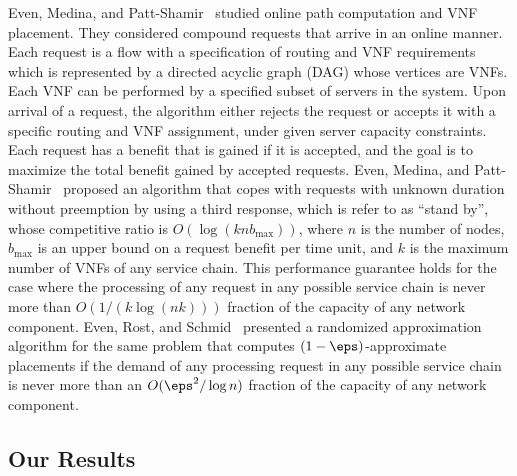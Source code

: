 Even, Medina, and Patt-Shamir~\cite{EMP16} studied online path
computation and VNF placement.  They considered compound requests that
arrive in an online manner.  Each request is a flow with a
specification of routing and VNF requirements which is represented by
a directed acyclic graph (DAG) whose vertices are VNFs.  Each VNF can
be performed by a specified subset of servers in the system.  Upon
arrival of a request, the algorithm either rejects the request or
accepts it with a specific routing and VNF assignment, under given
server capacity constraints.  Each request has a benefit that is
gained if it is accepted, and the goal is to maximize the total
benefit gained by accepted requests.
%
Even, Medina, and Patt-Shamir~\cite{EMP16} proposed an algorithm that
copes with requests with unknown duration without preemption by using
a third response, which is refer to as “stand by”, whose competitive
ratio is $O(\log (knb_{\max}))$, where $n$ is the number of nodes,
$b_{\max}$ is an upper bound on a request benefit per time unit, and
$k$ is the maximum number of VNFs of any service chain.  This
performance guarantee holds for the case where the processing of any
request in any possible service chain is never more than
$O(1/(k \log (nk)))$ fraction of the capacity of any network
component.
%
Even, Rost, and Schmid~\cite{ERS16} presented a randomized
approximation algorithm for the same problem that computes
$(1-\eps)$-approximate placements if the demand of any processing
request in any possible service chain is never more than an
$O(\eps^2/\log n)$ fraction of the capacity of any network component.


\subsection{Our Results}

